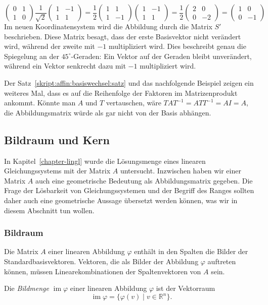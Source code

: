 \begin{beispiel}
\[\begin{pmatrix}
0&1\\1&0
\end{pmatrix}
\frac1{\sqrt{2}}\begin{pmatrix}
1&-1\\
1&1
\end{pmatrix}
=
\frac12
\begin{pmatrix}
1&1\\1&-1
\end{pmatrix}
\begin{pmatrix}
1&-1\\1&1
\end{pmatrix}
=
\frac12
\begin{pmatrix}
2&0\\0&-2
\end{pmatrix}
=
\begin{pmatrix}
1&0\\0&-1
\end{pmatrix}
\]
Im neuen Koordinatensystem wird die Abbildung durch die Matrix $S'$
beschrieben.
Diese Matrix besagt, dass der erste Basisvektor nicht verändert wird,
während der zweite mit $-1$ multipliziert wird.
Dies beschreibt genau die Spiegelung an der $45^\circ$-Geraden:
Ein Vektor auf der Geraden bleibt unverändert, während ein Vektor
senkrecht dazu mit $-1$ multipliziert wird.
\end{beispiel}

Der Satz~\ref{skript:affin:basiswechsel:satz} und das nachfolgende 
Beispiel zeigen ein weiteres Mal, dass es auf die Reihenfolge der
Faktoren im Matrizenprodukt ankommt.
Könnte man $A$ und $T$ vertauschen, wäre $TAT^{-1}=ATT^{-1}=AI=A$,
die Abbildungsmatrix würde als gar nicht von der Basis abhängen.

%
%
\subsection{Bildraum und Kern\label{subsection:affin:bildraumundkern}}
In Kapitel~\ref{chapter-lingl} wurde die Lösungsmenge eines linearen
Gleichungssystems mit der Matrix $A$ untersucht.
Inzwischen haben wir einer Matrix $A$ auch eine geometrische Bedeutung
als Abbildungsmatrix gegeben.
Die Frage der Lösbarkeit von Gleichungssystemen und der Begriff des
Ranges sollten daher auch eine geometrische Aussage übersetzt
werden können, was wir in diesem Abschnitt tun wollen.

\subsubsection{Bildraum}
Die Matrix $A$ einer linearen Abbildung $\varphi$ enthält in den Spalten
die Bilder der Standardbasisvektoren.
Vektoren, die als Bilder der Abbildung $\varphi$ auftreten können,
müssen Linearekombinationen der Spaltenvektoren von $A$ sein.
\begin{definition}
Die {\em Bildmenge} $\operatorname{im}\varphi$ einer linearen Abbildung
$\varphi$ ist der Vektorraum
\[
\operatorname{im}\varphi
=
\{\varphi(v)\;|\;v\in\mathbb R^n\}.
\]
\end{definition}

